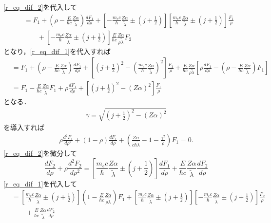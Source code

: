 \eqref{r_eq_dif_2}を代入して
\begin{align*}
  &= F_1 + \left(\rho - \frac{E}{\hbar c}\frac{Z\alpha}{\tilde{\lambda}}\right)\frac{dF_1}{d\rho} + \left[ - \frac{m_ec}{\hbar}\frac{Z\alpha}{\tilde{\lambda}}\pm\left(j + \frac{1}{2}\right)\right]\left[\frac{m_ec}{\hbar}\frac{Z\alpha}{\tilde{\lambda}}\pm\left(j + \frac{1}{2}\right)\right]\frac{F_1}{\rho} \\
  & \qquad + \left[ - \frac{m_ec}{\hbar}\frac{Z\alpha}{\tilde{\lambda}}\pm\left(j + \frac{1}{2}\right)\right]\frac{E}{\hbar c}\frac{Z\alpha}{\rho\tilde{\lambda}}F_2
\end{align*}
となり，\eqref{r_eq_dif_1}を代入すれば
\begin{align*}
  &= F_1 + \left(\rho - \frac{E}{\hbar c}\frac{Z\alpha}{\tilde{\lambda}}\right)\frac{dF_1}{d\rho} + \left[\left(j + \frac{1}{2}\right)^2 - \left(\frac{m_ec}{\hbar}\frac{Z\alpha}{\tilde{\lambda}}\right)^2\right]\frac{F_1}{\rho} + \frac{E}{\hbar c}\frac{Z\alpha}{\rho\tilde{\lambda}}\left[\rho\frac{dF_1}{d\rho} - \left(\rho - \frac{E}{\hbar c}\frac{Z\alpha}{\tilde{\lambda}}\right)F_1\right]\\
  &= F_1 - \frac{E}{\hbar c}\frac{Z\alpha}{\tilde{\lambda}}F_1 + \rho\frac{dF_1}{d\rho} + \left[\left(j + \frac{1}{2}\right)^2 - (Z\alpha)^2\right]\frac{F_1}{\rho}
\end{align*}
となる．
\begin{align}
  \gamma=\sqrt{\left(j + \frac{1}{2}\right)^2 - (Z\alpha)^2}\label{gamma_def}
\end{align}
を導入すれば
\begin{align}
  \rho\frac{d^2F_1}{d\rho^2} + (1 - \rho)\frac{dF_1}{d\rho} + \left(\frac{Z\alpha}{c\hbar\tilde{\lambda}} - 1 - \frac{\gamma^2}{\rho}\right)F_1=0.\label{r_eq_2dif_1}
\end{align}
\eqref{r_eq_dif_2}を微分して
\[\frac{dF_2}{d\rho} + \rho\frac{d^2F_2}{d\rho^2}=\left[\frac{m_ec}{\hbar}\frac{Z\alpha}{\tilde{\lambda}}\pm\left(j + \frac{1}{2}\right)\right]\frac{dF_1}{d\rho} + \frac{E}{\hbar c}\frac{Z\alpha}{\tilde{\lambda}}\frac{dF_2}{d\rho}\]
\eqref{r_eq_dif_1}を代入して
\begin{align*}
  &= \left[\frac{m_ec}{\hbar}\frac{Z\alpha}{\tilde{\lambda}}\pm\left(j + \frac{1}{2}\right)\right]\left(1 - \frac{E}{\hbar c}\frac{Z\alpha}{\rho\tilde{\lambda}}\right)F_1 + \left[\frac{m_ec}{\hbar}\frac{Z\alpha}{\tilde{\lambda}}\pm\left(j + \frac{1}{2}\right)\right]\left[ - \frac{m_ec}{\hbar}\frac{Z\alpha}{\tilde{\lambda}}\pm\left(j + \frac{1}{2}\right)\right]\frac{F_2}{\rho} \\
  & \qquad + \frac{E}{\hbar c}\frac{Z\alpha}{\tilde{\lambda}}\frac{dF_2}{d\rho}
\end{align*}
